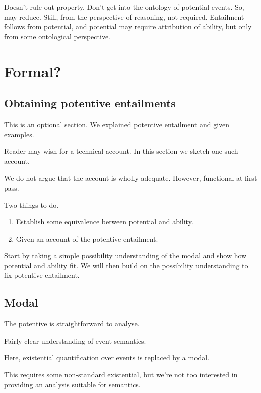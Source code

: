 \begin{note}[???]
  Doesn't rule out property.
  Don't get into the ontology of potential events.
  So, may reduce.
  Still, from the perspective of reasoning, not required.
  Entailment follows from potential, and potential may require attribution of ability, but only from some ontological perspective.
\end{note}


\section{Formal?}
\label{sec:formal}

\subsection{Obtaining potentive entailments}
\label{sec:obta-potent-enta}

\begin{note}
  This is an optional section.
  We explained potentive entailment and given examples.

  Reader may wish for a technical account.
  In this section we sketch one such account.

  We do not argue that the account is wholly adequate.
  However, functional at first pass.

  Two things to do.
  \begin{enumerate}
  \item Establish some equivalence between potential and ability.
  \item Given an account of the potentive entailment.
  \end{enumerate}

  Start by taking a simple possibility understanding of the modal and show how potential and ability fit.
  We will then build on the possibility understanding to fix potentive entailment.
\end{note}

\subsection{Modal}
\label{sec:modal}

\begin{note}[Potentive]
  The potentive is straightforward to analyse.

  Fairly clear understanding of event semantics.

  Here, existential quantification over events is replaced by a modal.

  This requires some non-standard existential, but we're not too interested in providing an analysis suitable for semantics.
\end{note}

